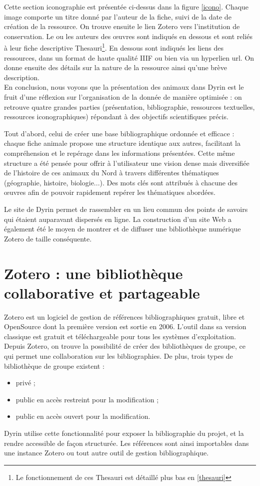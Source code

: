 \documentclass[a4paper,12pt,twoside]{book}
\begin{document}
Cette section iconographie est présentée ci-dessus dans la figure \ref{icono}. Chaque image comporte un titre donné par l'auteur de la fiche, suivi de la date de création de la ressource. On trouve ensuite le lien Zotero vers l'institution de conservation. Le ou les auteurs des \oe{}uvres sont indiqués en dessous et sont reliés à leur fiche descriptive Thesauri\footnote{Le fonctionnement de ces Thesauri est détaillé plus bas en \ref{thesauri}}. En dessous sont indiqués les liens des ressources, dans un format de haute qualité \acrshort{IIIF} ou bien via un hyperlien url. On donne ensuite des détails sur la nature de la ressource ainsi qu'une brève description.\\


En conclusion, nous voyons que la présentation des animaux dans Dyrin est le fruit d'une réflexion sur l'organisation de la donnée de manière optimisée  : on retrouve quatre grandes parties (présentation, bibliographie, ressources textuelles, ressources iconographiques) répondant à des objectifs scientifiques précis.

Tout d'abord, celui de créer une base bibliographique ordonnée et efficace : chaque fiche animale propose une structure identique aux autres, facilitant la compréhension et le repérage dans les informations présentées. Cette même structure a été pensée pour offrir à l'utilisateur une vision dense mais diversifiée de l'histoire de ces animaux du Nord à travers différentes thématiques (géographie, histoire, biologie...). Des mots clés sont attribués à chacune des \oe{}uvres afin de pouvoir rapidement repérer les thématiques abordées.

Le site de Dyrin permet de rassembler en un lieu commun des points de savoirs qui étaient auparavant dispersés en ligne. La construction d'un site Web a également été le moyen de montrer et de diffuser une bibliothèque numérique Zotero de taille conséquente.


\section{Zotero : une bibliothèque collaborative et partageable}\label{partie_zotero}

Zotero est un logiciel de gestion de références bibliographiques gratuit, libre et OpenSource dont la première version est sortie en 2006. L'outil dans sa version classique est gratuit et téléchargeable pour tous les systèmes d'exploitation. Depuis Zotero, on trouve la possibilité de créer des bibliothèques de groupe, ce qui permet une collaboration sur les bibliographies. De plus, trois types de bibliothèque de groupe existent :
\begin{itemize}
    \item privé ;
    \item public en accès restreint pour la modification ;
    \item public en accès ouvert pour la modification.
\end{itemize}
Dyrin utilise cette fonctionnalité pour exposer la bibliographie du projet, et la rendre accessible de façon structurée. Les références sont ainsi importables dans une instance Zotero ou tout autre outil de gestion bibliographique.
\end{document}
